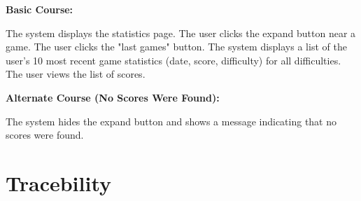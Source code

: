 \documentclass[11pt,a4paper]{article}
\newcommand{\heading}[1]{\vspace{1em}\noindent\textbf{#1}\par\vspace{0.5em}}
\begin{document}
\heading{Basic Course:}
The system displays the statistics page. The user clicks the expand button near a game. The user clicks the "last games" button. The system displays a list of the user's 10 most recent game statistics (date, score, difficulty) for all difficulties. The user views the list of scores.

\heading{Alternate Course (No Scores Were Found):}
The system hides the expand button and shows a message indicating that no scores were found.


\section{Tracebility}



\end{document}
